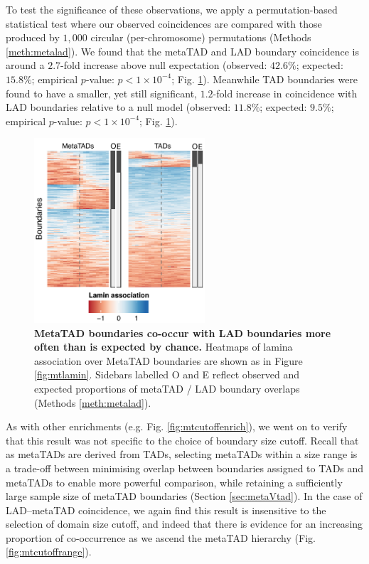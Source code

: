 \documentclass[a4paper,11pt,oneside]{book}
\begin{document}
To test the significance of these observations, we apply a permutation-based statistical test where our observed coincidences are compared with those produced by $1,000$ circular (per-chromosome) permutations (Methods \ref{meth:metalad}). We found that the metaTAD and LAD boundary coincidence is around a $2.7$-fold increase above null expectation (observed: $42.6\%$; expected: $15.8\%$; empirical $p$-value: $p < 1 \times 10^{-4}$; Fig. \ref{fig:mtsummary}). Meanwhile TAD boundaries were found to have a smaller, yet still significant, $1.2$-fold increase in coincidence with LAD boundaries relative to a null model (observed: $11.8\%$; expected: $9.5\%$; empirical $p$-value: $p < 1 \times 10^{-4}$; Fig. \ref{fig:mtsummary}).

\begin{figure}
\begin{center} 
\includegraphics[width=2.5in]{mt_laminsummary.pdf}
\captionsetup{width=\textwidth}
\caption[ MetaTAD boundaries co-occur with LAD boundaries more often than is expected by chance. ]{ {\bf MetaTAD boundaries co-occur with LAD boundaries more often than is expected by chance. }
Heatmaps of lamina association over MetaTAD boundaries are shown as in Figure \ref{fig:mtlamin}. Sidebars labelled O and E reflect observed and expected proportions of metaTAD / LAD boundary overlaps (Methods \ref{meth:metalad}).
}\label{fig:mtsummary}
\end{center}
\end{figure} 

As with other enrichments (e.g. Fig. \ref{fig:mtcutoffenrich}), we went on to verify that this result was not specific to the choice of boundary size cutoff. Recall that as metaTADs are derived from TADs, selecting metaTADs within a size range is a trade-off between minimising overlap between boundaries assigned to TADs and metaTADs to enable more powerful comparison, while retaining a sufficiently large sample size of metaTAD boundaries (Section \ref{sec:metaVtad}). In the case of LAD--metaTAD coincidence, we again find this result is insensitive to the selection of domain size cutoff, and indeed that there is evidence for an increasing proportion of co-occurrence as we ascend the metaTAD hierarchy (Fig. \ref{fig:mtcutoffrange}).
\end{document}
